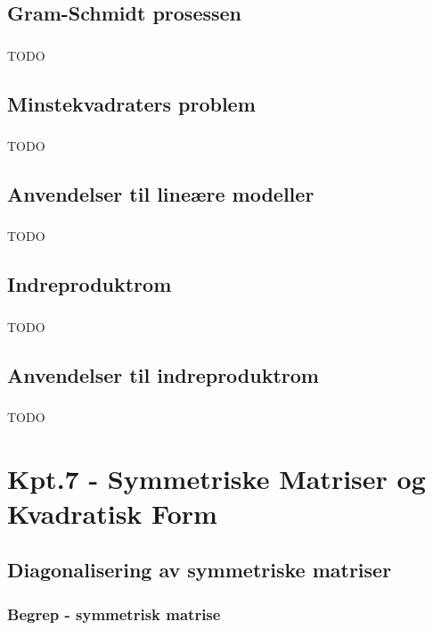 \documentclass{article}
\begin{document}
    \subsection{Gram-Schmidt prosessen}
      \subsubsection{}
        TODO
    \subsection{Minstekvadraters problem}
      \subsubsection{}
        TODO
    \subsection{Anvendelser til lineære modeller}
      \subsubsection{}
        TODO
    \subsection{Indreproduktrom}
      \subsubsection{}
        TODO
    \subsection{Anvendelser til indreproduktrom}
      \subsubsection{}
        TODO
  \section{Kpt.7 - Symmetriske Matriser og Kvadratisk Form}
    \subsection{Diagonalisering av symmetriske matriser}
      \subsubsection{Begrep - symmetrisk matrise}
        
\end{document}
